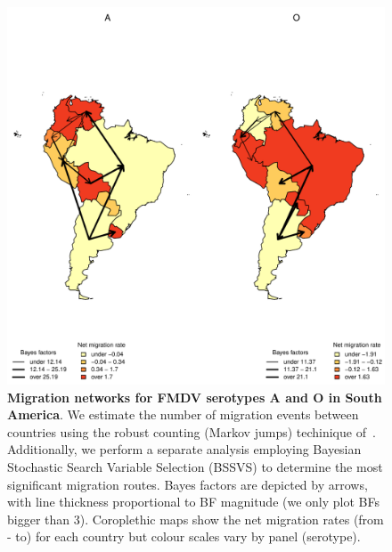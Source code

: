 \documentclass[10pt]{article}
\begin{document}
\begin{figure}[!ht]
\begin{center}
\includegraphics[scale=1]{FIGURES/PLOTS/MJandBFs.pdf}
\end{center}
\caption{\textbf{Migration networks for FMDV serotypes A and O in South America}.
We estimate the number of migration events between countries using the robust counting (Markov jumps) techinique of~\cite{Minin2008b}.
Additionally, we perform a separate analysis employing Bayesian Stochastic Search Variable Selection (BSSVS) to determine the most significant migration routes.
Bayes factors are depicted by arrows, with line thickness proportional to BF magnitude (we only plot BFs bigger than $3$).
Coroplethic maps show the net migration rates (from - to) for each country but colour scales vary by panel (serotype).
}
\label{fig:mj&BFs}
\end{figure}
\end{document}
